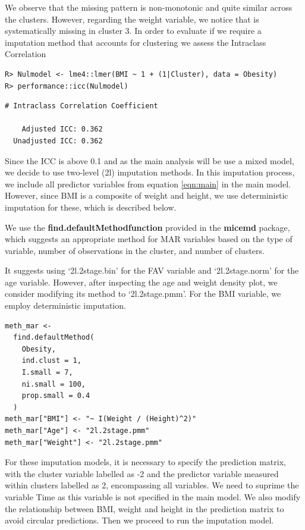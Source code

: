 \documentclass[
  article]{jss}
\begin{document}
We observe that the missing pattern is non-monotonic and quite similar
across the clusters. However, regarding the weight variable, we notice
that is systematically missing in cluster 3. In order to evaluate if we
require a imputation method that accounts for clustering we assess the
Intraclass Correlation

\begin{verbatim}
R> Nulmodel <- lme4::lmer(BMI ~ 1 + (1|Cluster), data = Obesity)
R> performance::icc(Nulmodel)
\end{verbatim}

\begin{verbatim}
# Intraclass Correlation Coefficient

    Adjusted ICC: 0.362
  Unadjusted ICC: 0.362
\end{verbatim}

Since the ICC is above 0.1 and as the main analysis will be use a mixed
model, we decide to use two-level (2l) imputation methods. In this
imputation process, we include all predictor variables from equation
\ref{eqn:main} in the main model. However, since BMI is a composite of
weight and height, we use deterministic imputation for these, which is
described below.

We use the \textbf{find.defaultMethodfunction} provided in the
\textbf{micemd} package, which suggests an appropriate method for MAR
variables based on the type of variable, number of observations in the
cluster, and number of clusters.

It suggests using `2l.2stage.bin' for the FAV variable and
`2l.2stage.norm' for the age variable. However, after inspecting the age
and weight density plot, we consider modifying its method to
`2l.2stage.pmm'. For the BMI variable, we employ deterministic
imputation.

\begin{verbatim}
meth_mar <-
  find.defaultMethod(
    Obesity,
    ind.clust = 1,
    I.small = 7,
    ni.small = 100,
    prop.small = 0.4
  )
meth_mar["BMI"] <- "~ I(Weight / (Height)^2)"
meth_mar["Age"] <- "2l.2stage.pmm"
meth_mar["Weight"] <- "2l.2stage.pmm"
\end{verbatim}

For these imputation models, it is necessary to specify the prediction
matrix, with the cluster variable labelled as -2 and the predictor
variable measured within clusters labelled as 2, encompassing all
variables. We need to suprime the variable Time as this variable is not
specified in the main model. We also modify the relationship between
BMI, weight and height in the prediction matrix to avoid circular
predictions. Then we proceed to run the imputation model.
\end{document}
